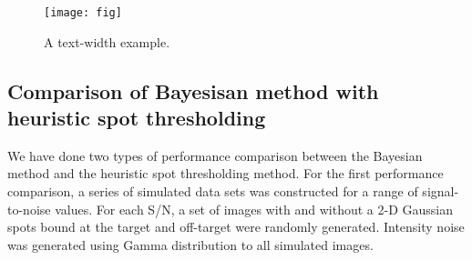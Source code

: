 \begin{figure}
\texttt{[image: fig]}
\caption{A text-width example.}
\label{fig:view}
\label{figsupp:sf1}
\label{videosupp:sv1}
\label{figdata:first}
\label{figdata:second}
\end{figure}

\subsection{Comparison of Bayesisan method with heuristic spot thresholding}

We have done two types of performance comparison between the Bayesian method and the heuristic spot thresholding method. For the first performance comparison, a series of simulated data sets was constructed for a range of signal-to-noise values. For each S/N, a set of images with and without a 2-D Gaussian spots bound at the target and off-target were randomly generated. Intensity noise was generated using Gamma distribution to all simulated images.

